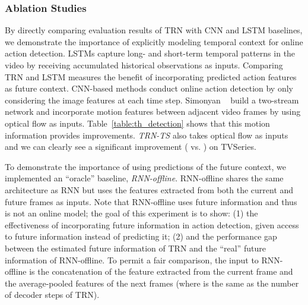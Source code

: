 \vspace{-10pt}
\subsubsection{Ablation Studies}

\vspace{-5pt} 
By directly comparing evaluation results of TRN with CNN and LSTM
baselines, we demonstrate the importance of explicitly modeling temporal
context  for online action detection. LSTMs capture long- and
short-term temporal patterns in the video  by
receiving accumulated
historical observations as inputs. Comparing TRN and LSTM measures the
benefit of incorporating predicted action features as future context.
CNN-based methods conduct online action detection by only considering
the image features at each time step. Simonyan \etal~\cite{simonyan2014two} build a
two-stream network and incorporate motion features
between adjacent video frames by using optical flow as inputs.
Table~\ref{table:th_detection} shows that this motion information
provides  improvements. \textit{TRN-TS}
also takes optical flow as inputs and we can clearly see
a significant improvement ( vs. ) on TVSeries.

  To
demonstrate the importance of using predictions of the future context,
we implemented an ``oracle'' baseline,
\textit{RNN-offline}. RNN-offline shares the same architecture as RNN
but uses the features extracted from both the current and future
frames as inputs. Note that RNN-offline uses future information and
thus is not an online model; the goal of this experiment is to show:
(1) the effectiveness of incorporating future information in action
detection, given access to future information
instead of predicting it; (2) and the performance gap between
the estimated future information of TRN and
the ``real'' future information of RNN-offline.
To permit a fair comparison, the input to RNN-offline is
the concatenation of the feature extracted from the current frame and
the average-pooled features of the next 
frames (where  is the same as the number of
decoder steps of TRN).

